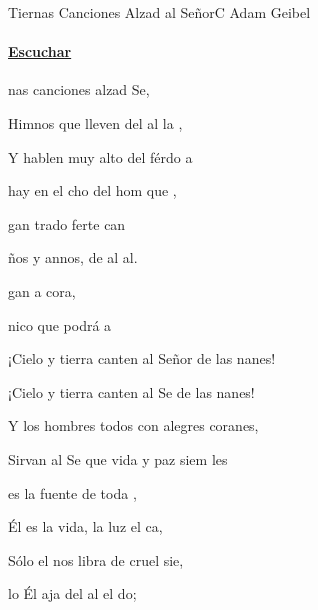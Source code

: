 \documentclass[12pt, spanish]{book}
\newcommand{\NotCCLIed}{\relax}
\begin{document}
    \begin{song}{Tiernas Canciones Alzad al Señor}{C}
    {} %
    {Adam Geibel}
    {} %
    {} %
        \ifChordBk
        \paragraph{\mbox{}\hfill\protect\href{https://www.youtube.com/watch?v=PIhIsopLWSE}{Escuchar}\mbox{}\hfill}
        \fi

        \begin{SBOpGroup}
            nas canciones alzad  Se,

            Himnos que lleven del al la ,

            Y hablen muy alto del férdo a

             hay en el cho del hom que ,

            gan trado ferte can

            ños y annos, de  al al.

            gan a   cora,

            nico  que podrá a
        \end{SBOpGroup}

        \begin{SBChorus}
            ¡Cielo y tierra canten al Señor de las nanes!

            ¡Cielo y tierra canten al Se de las nanes!

            Y los hombres todos con alegres coranes,

            Sirvan al Se que vida y paz siem les 
        \end{SBChorus}

        \begin{SBOpGroup}
             es la fuente de toda ,

            Él es la vida, la luz  el ca,

            Sólo el nos libra de cruel sie,

            lo Él aja del al el do;


\end{SBOpGroup}
\end{song}
\end{document}
